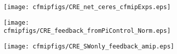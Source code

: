 \documentclass[varwidth, border=10pt]{standalone}
\begin{document}
\begin{figure}
  \centering
  \begin{subfigure}{0.48\textwidth}
  \texttt{[image: cfmipfigs/CRE\_net\_ceres\_cfmipExps.eps]}
\end{subfigure}
\begin{subfigure}{0.48\textwidth}
  \texttt{[image: cfmipfigs/CRE\_feedback\_fromPiControl\_Norm.eps]}
\end{subfigure}
\begin{subfigure}{0.48\textwidth}
  \texttt{[image: cfmipfigs/CRE\_SWonly\_feedback\_amip.eps]}
\end{subfigure}
\end{figure}
\end{document}
